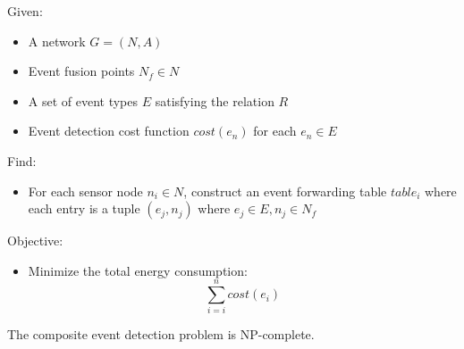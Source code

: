 Given:
\begin{itemize}
	\item A network \(G=(N, A)\)
	\item Event fusion points \(N_f\in N\)
	\item A set of event types \(E\) satisfying the relation \(R\)
	\item Event detection cost function \(cost(e_n)\) for each \(e_n\in E\)
\end{itemize}

Find:
\begin{itemize}
	\item For each sensor node \(n_i\in N\), construct an event forwarding table \(table_i\) where each entry is a tuple \((e_j, n_j)\) where \(e_j\in E, n_j\in N_f\)
\end{itemize}

Objective:
\begin{itemize}
	\item Minimize the total energy consumption:
	\begin{displaymath}
	\sum_{i=i}^{n}cost(e_i)
	\end{displaymath}
\end{itemize}

\begin{theorem}
\label{thm:tableConstruction}
The composite event detection problem is NP-complete.
\end{theorem}

